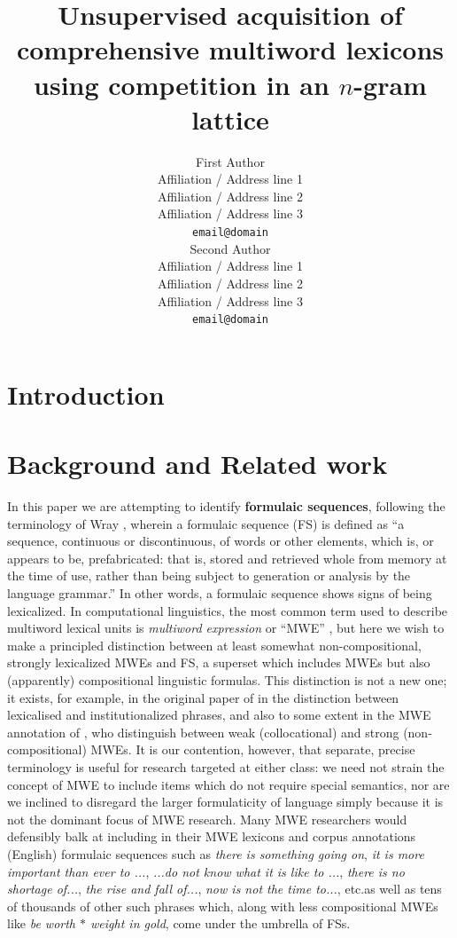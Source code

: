 \documentclass[11pt]{article}
\title{Unsupervised acquisition of comprehensive multiword lexicons \\ using competition in an $n$-gram lattice}
\author{First Author \\
  Affiliation / Address line 1 \\
  Affiliation / Address line 2 \\
  Affiliation / Address line 3 \\
  {\tt email@domain} \\\And
  Second Author \\
  Affiliation / Address line 1 \\
  Affiliation / Address line 2 \\
  Affiliation / Address line 3 \\
  {\tt email@domain} \\}
\date{}
\makeatletter
\def \etc {etc.\@ }
\newcommand{\dotts}{...}
\newcommand{\gap}{$*$\xspace}
\newcommand{\ex}[1]{\textit{#1}\xspace}
\newcommand{\termdef}[1]{\textbf{#1}\xspace}
\makeatother
\begin{document}
\maketitle
\begin{abstract}

\end{abstract}

\section{Introduction}

\section{Background and Related work}

In this paper we are attempting to identify \termdef{formulaic sequences}, following the terminology of Wray , wherein a formulaic sequence (FS) is defined as ``a sequence, continuous or discontinuous, of words or other elements, which is, or appears to be, prefabricated: that is, stored and retrieved whole from memory at the time of use, rather than being subject to generation or analysis by the language grammar.'' In other words, a formulaic sequence shows signs of being lexicalized. In computational linguistics, the most common term used to describe multiword lexical units is \emph{multiword expression} or ``MWE'' \cite{Sag02,Baldwin10}, but here we wish to make a principled distinction between at least somewhat non-compositional, strongly lexicalized MWEs and FS, a superset which includes MWEs but also (apparently) compositional linguistic formulas. This distinction is not a new one; it exists, for example, in the original paper of  in the distinction between lexicalised and institutionalized phrases, and also to some extent in the MWE annotation of , who distinguish between weak (collocational) and strong (non-compositional) MWEs. It is our contention, however, that separate, precise terminology is useful for research targeted at either class: we need not strain the concept of MWE to include items which do not require special semantics, nor are we inclined to disregard the larger formulaticity of language simply because it is not the dominant focus of MWE research. Many MWE researchers would defensibly balk at including in their MWE lexicons and corpus annotations (English) formulaic sequences such as \ex{there is something going on}, \ex{it is more important than ever to \dotts}, \ex{\dotts do not know what it is like to \dotts}, \ex{there is no shortage of\dotts}, \ex{the rise and fall of\dotts}, \ex{now is not the time to\dotts}, \etc as well as tens of thousands of other such phrases which, along with less compositional MWEs like \ex{be worth \gap weight in gold}, come under the umbrella of FSs.
\end{document}
